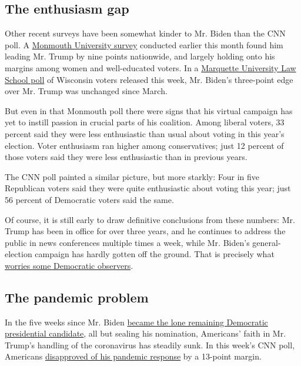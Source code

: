 \hypertarget{the-enthusiasm-gap}{%
\subsection{The enthusiasm gap}\label{the-enthusiasm-gap}}

Other recent surveys have been somewhat kinder to Mr. Biden than the CNN
poll. A
\href{https://www.monmouth.edu/polling-institute/documents/monmouthpoll_us_050620.pdf/}{Monmouth
University survey} conducted earlier this month found him leading Mr.
Trump by nine points nationwide, and largely holding onto his margins
among women and well-educated voters. In a
\href{https://law.marquette.edu/poll/2020/05/12/new-marquette-law-school-poll-finds-reduced-but-majority-support-for-covid-19-restrictions-while-partisan-divisions-increase/}{Marquette
University Law School poll} of Wisconsin voters released this week, Mr.
Biden's three-point edge over Mr. Trump was unchanged since March.

But even in that Monmouth poll there were signs that his virtual
campaign has yet to instill passion in crucial parts of his coalition.
Among liberal voters, 33 percent said they were less enthusiastic than
usual about voting in this year's election. Voter enthusiasm ran higher
among conservatives; just 12 percent of those voters said they were less
enthusiastic than in previous years.

The CNN poll painted a similar picture, but more starkly: Four in five
Republican voters said they were quite enthusiastic about voting this
year; just 56 percent of Democratic voters said the same.

Of course, it is still early to draw definitive conclusions from these
numbers: Mr. Trump has been in office for over three years, and he
continues to address the public in news conferences multiple times a
week, while Mr. Biden's general-election campaign has hardly gotten off
the ground. That is precisely what
\href{https://www.nytimes3xbfgragh.onion/2020/05/13/us/politics/joe-biden-donald-trump-2020.html}{worries
some Democratic observers}.

\hypertarget{the-pandemic-problem}{%
\subsection{The pandemic problem}\label{the-pandemic-problem}}

In the five weeks since Mr. Biden
\href{https://www.nytimes3xbfgragh.onion/2020/04/08/us/politics/bernie-sanders-drops-out.html}{became
the lone remaining Democratic presidential candidate}, all but sealing
his nomination, Americans' faith in Mr. Trump's handling of the
coronavirus has steadily sunk. In this week's CNN poll, Americans
\href{https://cdn.cnn.com/cnn/2020/images/05/12/rel5a.-.coronavirus.pdf}{disapproved
of his pandemic response} by a 13-point margin.

